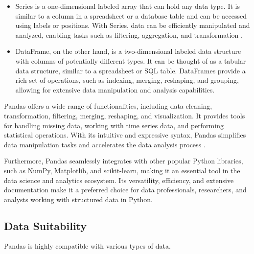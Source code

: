 	\begin{itemize}
		
		\item Series is a one-dimensional labeled array that can hold any data type. It is similar to a column in a spreadsheet or a database table and can be accessed using labels or positions. With Series, data can be efficiently manipulated and analyzed, enabling tasks such as filtering, aggregation, and transformation \cite{McKinney:2012}.
		
		\item DataFrame, on the other hand, is a two-dimensional labeled data structure with columns of potentially different types. It can be thought of as a tabular data structure, similar to a spreadsheet or SQL table. DataFrames provide a rich set of operations, such as indexing, merging, reshaping, and grouping, allowing for extensive data manipulation and analysis capabilities.
		
	\end{itemize}
	
	Pandas offers a wide range of functionalities, including data cleaning, transformation, filtering, merging, reshaping, and visualization. It provides tools for handling missing data, working with time series data, and performing statistical operations. With its intuitive and expressive syntax, Pandas simplifies data manipulation tasks and accelerates the data analysis process \cite{McKinney:2012}.
	
	Furthermore, Pandas seamlessly integrates with other popular Python libraries, such as NumPy, Matplotlib, and scikit-learn, making it an essential tool in the data science and analytics ecosystem. Its versatility, efficiency, and extensive documentation make it a preferred choice for data professionals, researchers, and analysts working with structured data in Python.

	\subsection{Data Suitability}
	
	Pandas is highly compatible with various types of data.
	
